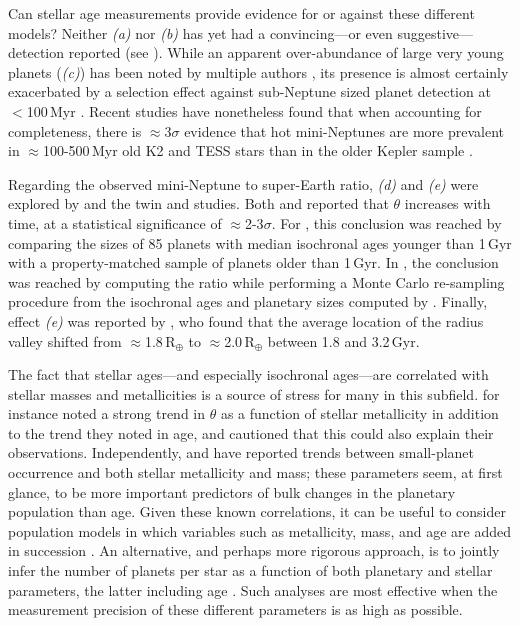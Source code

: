 \documentclass[11pt,twocolumn,tighten]{aastex63}
\begin{document}
Can stellar age measurements provide evidence for or against
these different models?  Neither {\it (a)} nor {\it (b)} has yet had a
convincing---or even suggestive--- detection reported (see
\citealt{Petigura_2022}).  While an apparent over-abundance of large
very young planets ({\it (c)}) has been noted by multiple authors
\citep[e.g.][]{2017AJ....153...64M,Bouma_2020}, its presence is almost certainly
exacerbated by a selection effect against sub-Neptune sized planet
detection at $<$100\,Myr \citep{Zhou_2021,Bouma_2022}.  Recent studies have
nonetheless found that when accounting for completeness, there is
$\approx$3$\sigma$ evidence that hot mini-Neptunes are more prevalent in
$\approx$100-500\,Myr old K2 \citep{2023AJ....166..248C} and TESS
\citep{2024arXiv240303261V} stars than in the older Kepler sample
\citep[e.g.][]{2020AJ....159..248K}.

Regarding the observed mini-Neptune to super-Earth ratio, {\it (d)} and {\it
(e)} were explored by \citet{Berger_2020b_rpage} and the twin
\citet{David_2021} and \citet{Sandoval_2021} studies.  Both
\citet{Berger_2020b_rpage} and \citet{Sandoval_2021} reported that $\theta$
increases with time, at a statistical significance of $\approx$2-3$\sigma$.
For \citet{Berger_2020b_rpage}, this conclusion was reached by comparing the
sizes of 85 planets with median isochronal ages younger than 1\,Gyr with a
property-matched sample of planets older than 1\,Gyr.  In
\citet{Sandoval_2021}, the conclusion was reached by computing the ratio while
performing a Monte Carlo re-sampling procedure from the isochronal ages and
planetary sizes computed by \citet{Fulton_Petigura_2018_cks_vii}.  Finally,
effect {\it (e)} was reported by \citet{David_2021}, who found that the average
location of the radius valley shifted from $\approx$1.8\,R$_\oplus$ to
$\approx$2.0\,R$_\oplus$ between 1.8 and 3.2\,Gyr.

The fact that stellar ages---and especially isochronal ages---are
correlated with stellar masses and metallicities is a source of stress
for many in this subfield.  \citet{Sandoval_2021} for instance noted a
strong trend in $\theta$ as a function of stellar metallicity in
addition to the trend they noted in age, and cautioned that this could
also explain their observations.  Independently, \citet{Petigura_2018}
and \citet{Petigura_2022} have reported trends between small-planet
occurrence and both stellar metallicity and mass; these parameters
seem, at first glance, to be more important predictors of bulk changes
in the planetary population than age.  Given these known correlations,
it can be useful to consider population models in which variables such
as metallicity, mass, and age are added in succession
\citep[e.g.][]{Thorngren_2021}.  An alternative, and perhaps more
rigorous approach, is to jointly infer the number of planets per star
as a function of both planetary and stellar parameters, the latter
including age \citep[e.g.][]{2023AJ....166..209M}.  Such analyses are
most effective when the measurement precision of these different
parameters is as high as possible.
\end{document}

